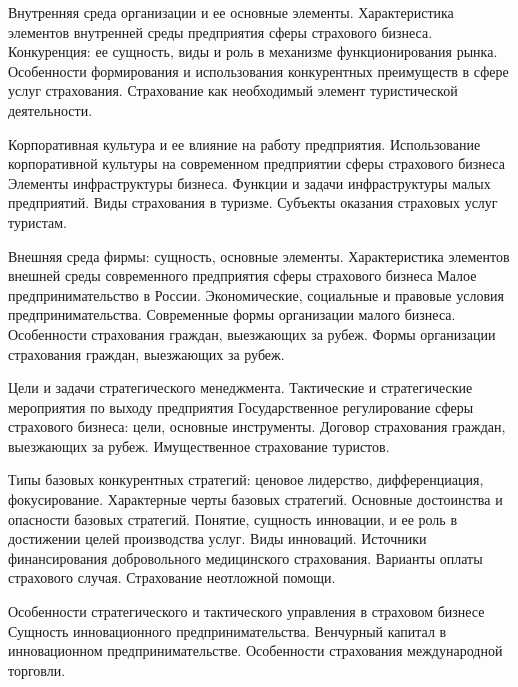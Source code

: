 \documentclass[
	11pt,
	a4paper,
	]
	{article}
\begin{document}
\bigskip

\noindent{} 
	{
		Внутренняя среда организации и ее основные элементы. Характеристика элементов внутренней среды предприятия сферы страхового бизнеса.
	}{
		Конкуренция: ее сущность, виды и роль в механизме функционирования рынка. Особенности формирования и использования конкурентных преимуществ в сфере услуг страхования.
	}{
		Страхование как необходимый элемент туристической деятельности.
	}

\bigskip

\noindent{} 
	{
		Корпоративная культура и ее влияние на работу предприятия. Использование корпоративной культуры на современном предприятии сферы страхового бизнеса
	}{
		Элементы инфраструктуры бизнеса. Функции и задачи инфраструктуры малых предприятий.
	}{
		Виды страхования в туризме. Субъекты оказания страховых услуг туристам.
	}

\bigskip

\noindent{} 
	{
		Внешняя среда фирмы: сущность, основные элементы. Характеристика элементов внешней среды современного предприятия сферы страхового бизнеса
	}{
		Малое предпринимательство в России. Экономические, социальные и правовые условия предпринимательства. Современные формы организации малого бизнеса.
	}{
		Особенности страхования граждан, выезжающих за рубеж. Формы организации страхования граждан, выезжающих за рубеж.
	}

\bigskip

\noindent{} 
	{
		Цели и задачи стратегического менеджмента. Тактические и стратегические мероприятия по выходу предприятия
	}{
		Государственное регулирование сферы страхового бизнеса: цели, основные инструменты.
	}{
		Договор страхования граждан, выезжающих за рубеж. Имущественное страхование туристов.
	}

\bigskip

\noindent{} 
	{
		Типы базовых конкурентных стратегий: ценовое лидерство, дифференциация, фокусирование. Характерные черты базовых стратегий. Основные достоинства и опасности базовых стратегий.
	}{
		Понятие, сущность инновации, и ее роль в достижении целей производства услуг. Виды инноваций.
	}{
		Источники финансирования добровольного медицинского страхования. Варианты оплаты страхового случая. Страхование неотложной помощи.
	}

\bigskip

\noindent{} 
	{
		Особенности стратегического и тактического управления в страховом бизнесе
	}{
		Сущность инновационного предпринимательства. Венчурный капитал в инновационном предпринимательстве.
	}{
		Особенности страхования международной торговли.
	}
\end{document}
